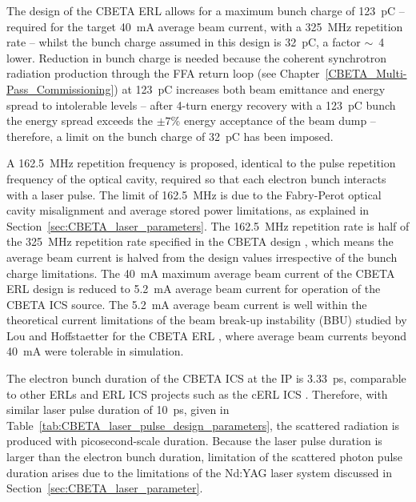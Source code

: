 \documentclass[../main.tex]{subfiles}
\begin{document}
The design of the CBETA ERL \cite{hoffstaetter2017cbeta} allows for a maximum bunch charge of 123~\si{\pico\coulomb} -- required for the target 40~\si{\milli\ampere} average beam current, with a 325~\si{\mega\hertz} repetition rate -- whilst the bunch charge assumed in this design is 32~\si{\pico\coulomb}, a factor $\sim$~4 lower. Reduction in bunch charge is needed because the coherent synchrotron radiation production through the FFA return loop (see Chapter~\ref{CBETA_Multi-Pass_Commissioning}) at 123~\si{\pico\coulomb} increases both beam emittance and energy spread to intolerable levels -- after 4-turn energy recovery with a 123~\si{\pico\coulomb} bunch the energy spread exceeds the $\pm 7$\% energy acceptance of the beam dump \cite{lou2020coherent} -- therefore, a limit on the bunch charge of 32~\si{\pico\coulomb} has been imposed. 

A 162.5~\si{\mega\hertz} repetition frequency is proposed, identical to the pulse repetition frequency of the optical cavity, required so that each electron bunch interacts with a laser pulse. The limit of 162.5~\si{\mega\hertz} is due to the Fabry-Perot optical cavity misalignment and average stored power limitations, as explained in Section~\ref{sec:CBETA_laser_parameters}. The 162.5~\si{\mega\hertz} repetition rate is half of the 325~\si{\mega\hertz} repetition rate specified in the CBETA design \cite{hoffstaetter2017cbeta}, which means the average beam current is halved from the design values irrespective of the bunch charge limitations. The  40~\si{\milli\ampere} maximum average beam current of the CBETA ERL design is reduced to 5.2~\si{\milli\ampere} average beam current for operation of the CBETA ICS source. The 5.2~\si{\milli\ampere} average beam current is well within the theoretical current limitations of the beam break-up instability (BBU) studied by Lou and Hoffstaetter for the CBETA ERL \cite{lou2019beam}, where average beam currents beyond 40~\si{\milli\ampere} were tolerable in simulation.   

The electron bunch duration of the CBETA ICS at the IP is 3.33~\si{\pico\second}, comparable to other ERLs \cite{angal2018perle} and ERL ICS projects such as the cERL ICS \cite{akagi2016narrow}. Therefore, with similar laser pulse duration of 10~\si{\pico\second}, given in Table~\ref{tab:CBETA_laser_pulse_design_parameters}, the scattered radiation is produced with picosecond-scale duration. Because the laser pulse duration is larger than the electron bunch duration, limitation of the scattered photon pulse duration arises due to the limitations of the Nd:YAG laser system discussed in Section~\ref{sec:CBETA_laser_parameter}.
\end{document}
